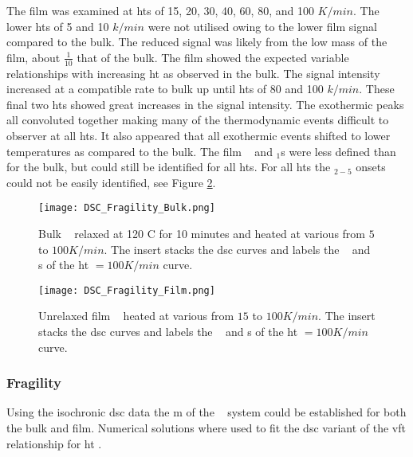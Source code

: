 \documentclass[a4paper,12pt,oneside]{article}%
\begin{document}
The film was examined at \glspl{ht} of 15, 20, 30, 40, 60, 80, and 100 $K/min$. The lower \glspl{ht} of 5 and 10 $k/min$ were not utilised owing to the lower film signal compared to the bulk. The reduced signal was likely from the low mass of the film, about $\frac{1}{10}$ that of the bulk. The film showed the expected variable relationships with increasing \gls{ht} as observed in the bulk. The signal intensity increased at a compatible rate to bulk up until \glspl{ht} of 80 and 100 $k/min$. These final two \glspl{ht} showed great increases in the signal intensity. The exothermic peaks all convoluted together making many of the thermodynamic events difficult to observer at all \glspl{ht}. It also appeared that all exothermic events shifted to lower temperatures as compared to the bulk. The film \Tg~ and \Tx $_{1}$s were less defined than for the bulk, but could still be identified for all \glspl{ht}. For all \glspl{ht} the \Tx $_{2-5}$ onsets could not be easily identified, see Figure \ref{fig:DSC_vHeatingRate_Film}.

\begin{figure}[b]
	\centering
	\texttt{[image: DSC\_Fragility\_Bulk.png]}
	\caption{Bulk \MgZnCa~ relaxed at 120 \degree C for 10 minutes and heated at various  from $5$ to $100 K/min$. The insert stacks the \gls{dsc} curves and labels the \Tg~ and \Tx s of the \gls{ht} $=100 K/min$ curve.}%
	\label{fig:DSC_vHeatingRate_Bulk}
\end{figure}

\begin{figure}[b]
	\centering
	\texttt{[image: DSC\_Fragility\_Film.png]}
	\caption{Unrelaxed film \MgZnCa~ heated at various   from $15$ to $100 K/min$. The insert stacks the \gls{dsc} curves and labels the \Tg~ and \Tx s of the \gls{ht} $=100 K/min$ curve.}%
	\label{fig:DSC_vHeatingRate_Film}
\end{figure}

\subsubsection{Fragility}

Using the isochronic \acrshort{dsc} data the \gls{m} of the \MgZnCa~ system could be established for both the bulk and film. Numerical solutions where used to fit the \acrshort{dsc} variant of the \gls{vft} relationship for \gls{ht} \cite{Busch1998}.
\end{document}
